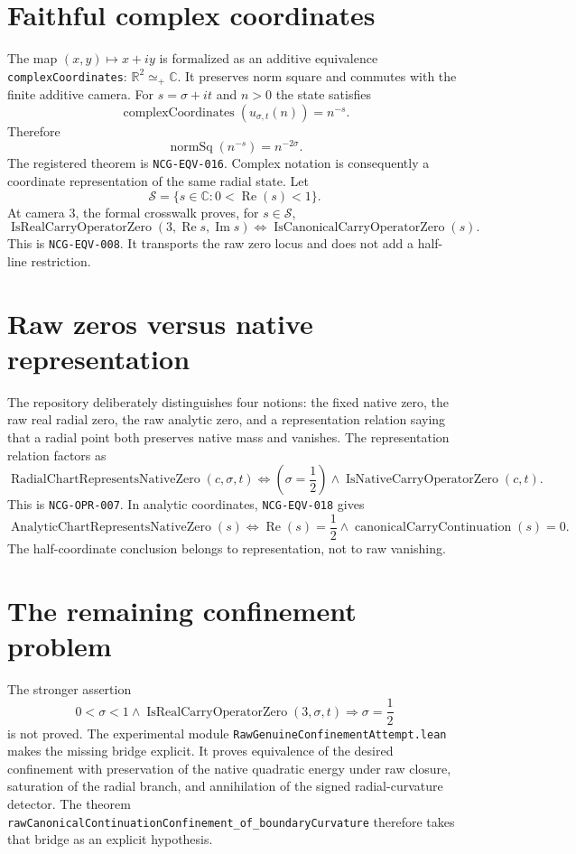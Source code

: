 \documentclass[11pt,a4paper]{article}
\newcommand{\R}{\mathbb{R}}
\begin{document}
\section{Faithful complex coordinates}
The map $(x,y)\mapsto x+iy$ is formalized as an additive equivalence \texttt{complexCoordinates}: $\R^2\simeq_+\mathbb C$. It preserves norm square and commutes with the finite additive camera.
For $s=\sigma+it$ and $n>0$ the state satisfies
\[ \operatorname{complexCoordinates}(u_{\sigma,t}(n))=n^{-s}. \]
Therefore
\[ \operatorname{normSq}(n^{-s})=n^{-2\sigma}. \]
The registered theorem is \texttt{NCG-EQV-016}. Complex notation is consequently a coordinate representation of the same radial state.
Let
\[ \mathcal S=\{s\in\mathbb C:0<\operatorname{Re}(s)<1\}. \]
At camera $3$, the formal crosswalk proves, for $s\in\mathcal S$,
\[ \operatorname{IsRealCarryOperatorZero}(3,\operatorname{Re}s,\operatorname{Im}s)\Longleftrightarrow \operatorname{IsCanonicalCarryOperatorZero}(s). \]
This is \texttt{NCG-EQV-008}. It transports the raw zero locus and does not add a half-line restriction.
\section{Raw zeros versus native representation}
The repository deliberately distinguishes four notions: the fixed native zero, the raw real radial zero, the raw analytic zero, and a representation relation saying that a radial point both preserves native mass and vanishes.
The representation relation factors as
\[ \operatorname{RadialChartRepresentsNativeZero}(c,\sigma,t)\Longleftrightarrow \left(\sigma=\frac12\right)\land\operatorname{IsNativeCarryOperatorZero}(c,t). \]
This is \texttt{NCG-OPR-007}. In analytic coordinates, \texttt{NCG-EQV-018} gives
\[ \operatorname{AnalyticChartRepresentsNativeZero}(s)\Longleftrightarrow \operatorname{Re}(s)=\frac12\land\operatorname{canonicalCarryContinuation}(s)=0. \]
The half-coordinate conclusion belongs to representation, not to raw vanishing.
\section{The remaining confinement problem}
The stronger assertion
\[ 0<\sigma<1\land\operatorname{IsRealCarryOperatorZero}(3,\sigma,t)\Longrightarrow\sigma=\frac12 \]
is not proved. The experimental module \texttt{RawGenuineConfinementAttempt.lean} makes the missing bridge explicit. It proves equivalence of the desired confinement with preservation of the native quadratic energy under raw closure, saturation of the radial branch, and annihilation of the signed radial-curvature detector. The theorem \texttt{rawCanonicalContinuationConfinement\_of\_boundaryCurvature} therefore takes that bridge as an explicit hypothesis.
\end{document}
